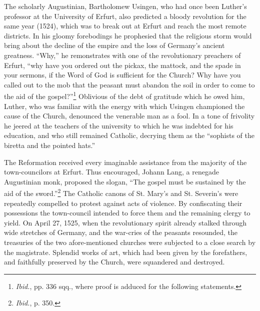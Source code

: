 The scholarly Augustinian, Bartholomew Usingen, who had once
been Luther’s professor at the University of Erfurt, also predicted
a bloody revolution for the same year (1524), which was to break
out at Erfurt and reach the most remote districts. In his gloomy forebodings
he prophesied that the religious storm would bring about
the decline of the empire and the loss of Germany’s ancient greatness.
“Why,” he remonstrates with one of the revolutionary preachers
of Erfurt, “why have you ordered out the pickax, the mattock, and
the spade in your sermons, if the Word of God is sufficient for the
Church? Why have you called out to the mob that the peasant must
abandon the soil in order to come to the aid of the gospel?”\footnote
{\textit{Ibid.}, pp. 336 sqq., where proof is adduced for the following statements.}
Oblivious of the debt of gratitude which he owed him, Luther, who
was familiar with the energy with which Usingen championed the
cause of the Church, denounced the venerable man as a fool. In a tone
of frivolity he jeered at the teachers of the university to which he was
indebted for his education, and who still remained Catholic, decrying
them as the “sophists of the biretta and the pointed hats.”

The Reformation received every imaginable assistance from the
majority of the town-councilors at Erfurt. Thus encouraged, Johann
Lang, a renegade Augustinian monk, proposed the slogan, “The
gospel must be sustained by the aid of the sword.”\footnote{\textit{Ibid.}, p. 350.}
The Catholic
canons of St. Mary’s and St. Severin’s were repeatedly compelled
to protest against acts of violence. By confiscating their possessions
the town-council intended to force them and the remaining clergy
to yield. On April 27, 1525, when the revolutionary spirit already
stalked through wide stretches of Germany, and the war-cries of
the peasants resounded, the treasuries of the two afore-mentioned
churches were subjected to a close search by the magistrate. Splendid
works of art, which had been given by the forefathers, and faithfully
preserved by the Church, were squandered and destroyed.

